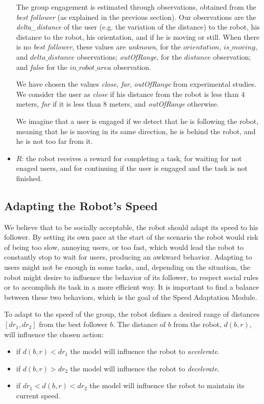 \begin{itemize}
		The group engagement is estimated through observations, obtained from the \textit{best follower} (as explained in the previous section). Our observations are the \textit{delta\_distance} of the user (e.g. the variation of the distance) to the robot, his distance to the robot, his orientation, and if he is moving or still. When there is no \textit{best follower}, these values are \textit{unknown}, for the $orientation$, $is\_moving$, and $delta\_distance$ observations; \textit{outOfRange}, for the $distance$ observation; and \textit{false} for the $in\_robot\_area$ observation.

		We have chosen the values \textit{close}, \textit{far}, \textit{outOfRange} from experimental studies. We consider the user as \textit{close} if his distance from the robot is less than 4 meters, \textit{far} if it is less than 8 meters, and  \textit{outOfRange} otherwise.

		We imagine that a user is engaged if we detect that he is following the robot, meaning that he is moving in its same direction, he is behind the robot, and he is not too far from it.

	\item  $R$: the robot receives a reward for completing a task, for waiting for not enaged users, and for continuing if the user is engaged and the task is not finished.
\end{itemize}


\subsection{Adapting the Robot's Speed}
We believe that to be socially acceptable, the robot should adapt its speed to his follower. By setting its own pace at the start of the scenario the robot  would risk of being too slow, annoying users, or too fast, which would lead the robot to constantly stop to wait for users, producing an awkward behavior. Adapting to users might not be enough in some tasks, and, depending on the situation, the robot might desire to influence the behavior of its follower, to respect social rules or to accomplish its task in a more efficient way. It is important to find a balance between these two behaviors, which is the goal of the Speed Adaptation Module. 

To adapt to the speed of the group, the robot defines a desired range of distances $[dr_1,dr_2]$ from the best follower $b$. The distance of $b$ from the robot, $d(b,r)$, will influence the chosen action:
\begin{itemize}
\item if $d(b,r)<dr_1$ the model will influence the robot to \textit{accelerate}.
\item if $d(b,r)>dr_2$  the model will influence the robot to \textit{decelerate}.
\item if $dr_1<d(b,r)<dr_2$ the model will influence the robot to maintain its current speed.
\end{itemize} 

